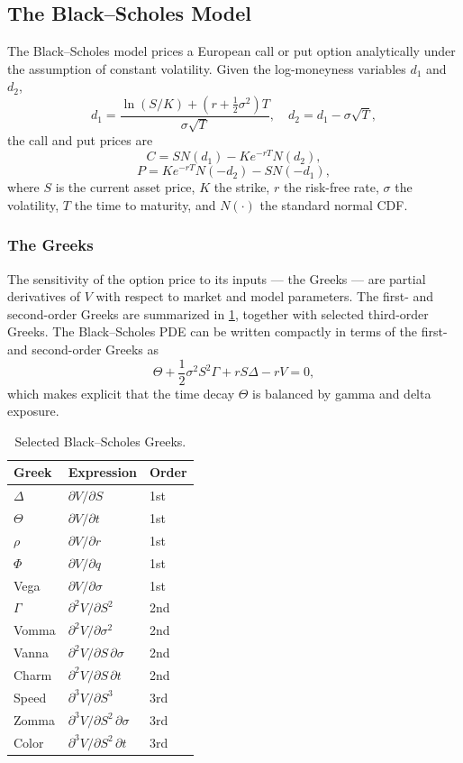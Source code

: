 \subsection{The Black--Scholes Model}\label{subsection:bs}

The Black--Scholes model \parencite{abdelmessih2026visualoptions} prices a European call or put option analytically under the assumption of constant volatility. Given the log-moneyness variables $d_1$ and $d_2$,
\[
d_1 = \frac{\ln(S/K) + (r + \tfrac{1}{2}\sigma^2)T}{\sigma\sqrt{T}},
\quad
d_2 = d_1 - \sigma\sqrt{T},
\]
the call and put prices are
\[
C = S N(d_1) - K e^{-rT} N(d_2),
\]
\[
P = K e^{-rT} N(-d_2) - S N(-d_1),
\]
where $S$ is the current asset price, $K$ the strike, $r$ the risk-free rate, $\sigma$ the volatility, $T$ the time to maturity, and $N(\cdot)$ the standard normal CDF.

\subsubsection*{The Greeks}

The sensitivity of the option price to its inputs — the Greeks — are partial derivatives of $V$ with respect to market and model parameters. The first- and second-order Greeks are summarized in \cref{table:greeks}, together with selected third-order Greeks. The Black--Scholes PDE can be written compactly in terms of the first- and second-order Greeks as
\[
\Theta + \frac{1}{2}\sigma^2 S^2 \Gamma + rS\Delta - rV = 0,
\]
which makes explicit that the time decay $\Theta$ is balanced by gamma and delta exposure.

\begin{table}[h]
\centering
\caption{Selected Black--Scholes Greeks.}\label{table:greeks}
\begin{tabular}{lll}
\toprule
Greek & Expression & Order \\
\midrule
$\Delta$ & $\partial V/\partial S$ & 1st \\
$\Theta$ & $\partial V/\partial t$ & 1st \\
$\rho$ & $\partial V/\partial r$ & 1st \\
$\Phi$ & $\partial V/\partial q$ & 1st \\
Vega & $\partial V/\partial \sigma$ & 1st \\
$\Gamma$ & $\partial^2 V/\partial S^2$ & 2nd \\
Vomma & $\partial^2 V/\partial\sigma^2$ & 2nd \\
Vanna & $\partial^2 V/\partial S\,\partial\sigma$ & 2nd \\
Charm & $\partial^2 V/\partial S\,\partial t$ & 2nd \\
Speed & $\partial^3 V/\partial S^3$ & 3rd \\
Zomma & $\partial^3 V/\partial S^2\,\partial\sigma$ & 3rd \\
Color & $\partial^3 V/\partial S^2\,\partial t$ & 3rd \\
\bottomrule
\end{tabular}
\end{table}


